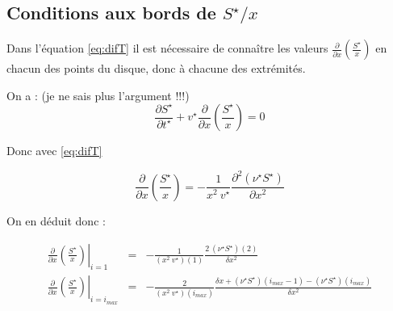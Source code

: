 \subsection{Conditions aux bords de $S^{\star}/x$}

Dans l'équation \eqref{eq:difT} il est nécessaire de connaître les valeurs $\frac{\partial}{\partial x}\left(\frac{S^{\star}}{x}\right)$ en chacun des points du disque, donc à chacune des extrémités. 

On a : (je ne sais plus l'argument !!!)
\begin{equation}
  \frac{\partial S^{\star}}{\partial t^{\star}} + v^{\star} \frac{\partial}{\partial x} \left(\frac{S^{\star}}{x}\right)=0
\end{equation}

Donc avec \eqref{eq:difT}

\begin{equation}
  \frac{\partial}{\partial x} \left(\frac{S^{\star}}{x}\right) = -\frac{1}{x^2\ v^{\star}} \frac{\partial^2 (\nu^{\star} S^{\star})}{\partial x^2}
\end{equation}

On en déduit donc :

\begin{eqnarray}
  \left. \frac{\partial}{\partial x} \left(\frac{S^{\star}}{x}\right) \right|_{i=1 }&=& - \frac{1}{(x^2\ v^{\star})(1)} \frac{2\ (\nu^{\star} S^{\star})(2)}{\delta x ^2} \\
  \left. \frac{\partial}{\partial x} \left(\frac{S^{\star}}{x}\right) \right|_{i=i_{max}} &=& - \frac{2}{(x^2\ v^{\star})(i_{max})} \frac{\delta x + (\nu^{\star} S^{\star})(i_{max}-1)- (\nu^{\star} S^{\star})(i_{max})}{\delta x^2}
\end{eqnarray}
